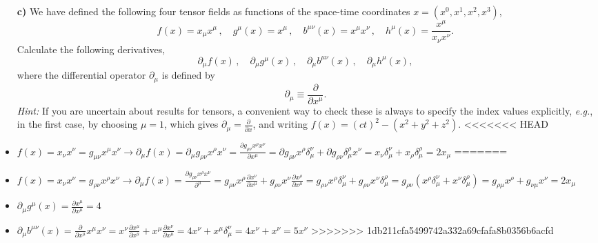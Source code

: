 \documentclass[11pt,a4paper]{report}
\newcounter{excount}[chapter]
\newenvironment{exercise}[1][]{\addtocounter{excount}{1} \noindent {\bf Problem
    \arabic{excount} \ \ #1}\hspace{2mm}}{\vspace{4mm}}
\begin{document}
\begin{exercise}
\begin{itemize}
\item[\bf c)] We have defined the following four tensor fields as functions of the space-time coordinates $x=(x^0,x^1,x^2,x^3)$,
\begin{equation}
f(x) =x_{\mu}x^{\mu}\,,\quad g^{\mu}(x) =x^{\mu}\,,\quad b^{\mu\nu}(x) =x^{\mu}x^{\nu}\,,\quad h^{\mu} (x) =\frac{x^{\mu}}{x_{\nu}x^{\nu}}.
\end{equation}
Calculate the following derivatives, 
\begin{equation}
\partial_{\mu} f(x)\,,\quad \partial_{\mu}g^{\mu}(x)\,,\quad \partial_{\mu} b^{\mu\nu}(x)\,,\quad \partial_{\mu} h^{\mu} (x),
\end{equation}
where the differential operator $\partial_{\mu}$ is defined by
\begin{equation}
\partial_{\mu}\equiv \frac{\partial}{\partial x^\mu}.
\end{equation}
{\it Hint:} If you are uncertain about results for tensors, a convenient way to check these is always to specify the index values explicitly, {\it e.g.}, in the first case, by choosing $\mu=1$, which gives $\partial_{\mu}=\frac{\partial}{\partial x}$, and writing $f(x)=(ct)^2-(x^2+y^2+z^2)$.
<<<<<<< HEAD
\item $f(x)=x_{\nu} x^{\nu}=g_{\mu\nu} x^{\mu}x^{\nu} \rightarrow \partial_{\mu}f(x)=\partial_{\mu}  g_{\rho \nu} x^{\rho} x^{\nu}=\frac{\partial g_{\rho \nu} x^{\rho} x^{\nu} }{\partial x^{\mu}}=\partial g_{\rho \nu} x^{\rho} \delta_{\mu}^{\nu}+\partial g_{\rho \nu} \delta_{\mu}^{\rho} x^{\nu}=x_{\nu} \delta^{\nu}_{\mu}+x_{\rho}\delta^{\rho}_{\mu}=2x_{\mu}$
=======
\item $f(x)=x_{\nu}x^{\nu} = g_{\rho 
\nu} x^{\rho}x^{\nu}  \rightarrow \partial_{\mu} f(x) = \frac{\partial g_{\rho 
\nu} x^{\rho}x^{\nu}}{\partial^{\mu}} = g_{\rho 
\nu} x^{\rho} \frac{ \partial x^{\nu}}{\partial x^{\mu}} + g_{\rho \nu} x^{\nu} \frac{\partial x^{\rho}}{\partial x{^\mu}}    = g_{\rho 
\nu} x^{\rho} \delta^{\nu}_{\mu} + g_{\rho \nu} x^{\nu} \delta_{\mu}^{\rho}=  g_{\rho 
\nu} ( x^{\rho} \delta^{\nu}_{\mu} + x^{\nu} \delta_{\mu}^{\rho} )=g_{\rho 
\mu} x^{\rho}+g_{\nu \mu} x^{\nu}=2x_{\mu}$
\item $\partial_{\mu}g^{\mu}(x)=\frac{\partial x^{\mu}}{\partial x^{\mu}}=4$ 
\item $ \partial_{\mu} b^{\mu\nu}(x)=\frac{\partial}{\partial x^{\mu}}  x^{\mu}x^{\nu}= x^{\nu}\frac{\partial x^{\mu}}{\partial x^{\mu}}+ x^{\mu}\frac{\partial x^{\nu}}{\partial x^{\mu}}=4x^{\nu}+x^{\mu} \delta_{\mu}^{\nu}=4x^{\nu}+x^{\nu}=5x^{\nu}$ 
>>>>>>> 1db211cfa5499742a332a69cfafa8b0356b6acfd
\end{itemize}




\end{exercise}
\end{document}
